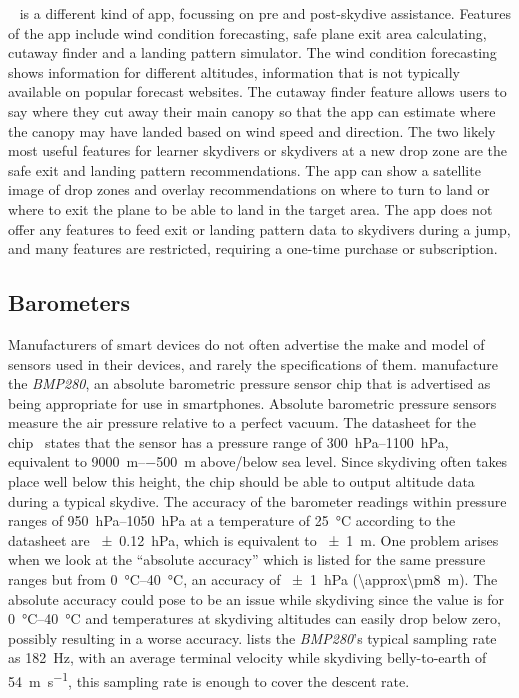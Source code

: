 \documentclass[11pt, a4paper, twocolumn]{article}
\newcommand{\hPa}{\hecto\pascal} %
\begin{document}
~\cite{inc_spot_2017} is a different kind of app, focussing on pre and post-skydive assistance. Features of the app include wind condition forecasting, safe plane exit area calculating, cutaway finder and a landing pattern simulator. The wind condition forecasting shows information for different altitudes, information that is not typically available on popular forecast websites. The cutaway finder feature allows users to say where they cut away their main canopy so that the app can estimate where the canopy may have landed based on wind speed and direction. The two likely most useful features for learner skydivers or skydivers at a new drop zone are the safe exit and landing pattern recommendations. The app can show a satellite image of drop zones and overlay recommendations on where to turn to land or where to exit the plane to be able to land in the target area. The app does not offer any features to feed exit or landing pattern data to skydivers during a jump, and many features are restricted, requiring a one-time purchase or subscription.

\subsection{Barometers}\label{sec:barometers} %

Manufacturers of smart devices do not often advertise the make and model of sensors used in their devices, and rarely the specifications of them. \citeauthor{bosch_bmp280:_2016} manufacture the \textit{BMP280}, an absolute barometric pressure sensor chip that is advertised as being appropriate for use in smartphones. Absolute barometric pressure sensors measure the air pressure relative to a perfect vacuum. The datasheet for the chip~\cite{bosch_bmp280:_2016} states that the sensor has a pressure range of \SIrange{300}{1100}{\hPa}, equivalent to \SIrange{+9000}{-500}{\metre} above/below sea level. Since skydiving often takes place well below this height, the chip should be able to output altitude data during a typical skydive. The accuracy of the barometer readings within pressure ranges of \SIrange{950}{1050}{\hPa} at a temperature of \SI{25}{\degreeCelsius} according to the datasheet are \SI{\pm0.12}{\hPa}, which is equivalent to \SI{\pm1}{\metre}. One problem arises when we look at the ``absolute accuracy'' which is listed for the same pressure ranges but from \SIrange{0}{40}{\degreeCelsius}, an accuracy of \SI{\pm1}{\hPa} (\SI{\approx\pm8}{\metre}). The absolute accuracy could pose to be an issue while skydiving since the value is for \SIrange{0}{40}{\degreeCelsius} and temperatures at skydiving altitudes can easily drop below zero, possibly resulting in a worse accuracy. \citeauthor{bosch_bmp280:_2016} lists the \textit{BMP280}'s typical sampling rate as \SI{182}{\Hz}, with an average terminal velocity while skydiving belly-to-earth of \SI{54}{\metre\per\second}, this sampling rate is enough to cover the descent rate.
\end{document}
